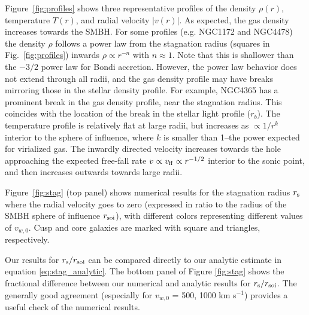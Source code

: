 \documentclass[usenatbib,fleqn]{mn2e}
\newcommand{\rb}{r_b}
\begin{document}
Figure~\ref{fig:profiles} shows three representative profiles of the density $\rho(r)$, temperature $T(r)$, and radial velocity $|v(r)|$.  As expected, the gas density increases towards the SMBH.  For some profiles (e.g. NGC1172 and NGC4478) the density $\rho$ follows a power law from the stagnation radius (squares in Fig.~\ref{fig:profiles}) inwards $\rho \propto r^{-n}$ with $n \approx 1$. Note that this is shallower than the $-3/2$ power law for Bondi accretion. However, the power law behavior does not extend through all radii, and the gas density profile may have breaks mirroring those in the stellar density profile. For example, NGC4365 has a prominent break in the gas density profile, near the stagnation radius. This coincides with the location
of the break in the stellar light profile ($\rb$). The temperature profile is relatively flat at large radii, but increases as $\propto
1/r^{k}$ interior to the sphere of influence, where $k$ is smaller than 1--the power expected for virialized gas.  The inwardly
directed velocity increases towards the hole approaching the expected free-fall rate $v \propto v_{\rm ff}\propto r^{-1/2}$ interior to the sonic point, and then increases outwards towards large radii.

Figure~\ref{fig:stag} (top panel) shows numerical results for the stagnation radius $r_{\rm s}$ where the radial velocity goes to zero (expressed in ratio to the radius of the SMBH sphere of influence $r_{\rm soi}$), with different colors representing different values of $v_{w,0}$.  Cusp and core galaxies are marked with square and triangles, respectively.  

Our results for $r_{\rm s}/r_{\rm soi}$ can be compared directly to our analytic estimate in equation \ref{eq:stag_analytic}.  The bottom panel of Figure \ref{fig:stag} shows the fractional difference between our numerical and analytic results for $r_{\rm s}/r_{\rm soi}$.  The generally good agreement (especially for $v_{w,0}$ = 500, 1000 km s$^{-1}$) provides a useful check of the numerical results.
\end{document}
